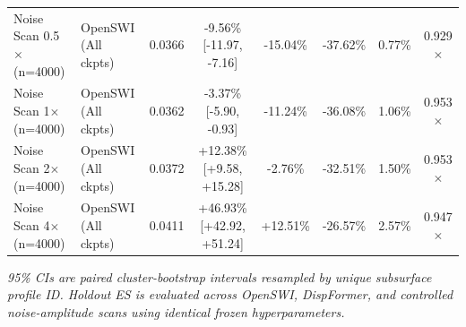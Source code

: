 \begin{table}[t]
\begin{tabular}{llcccccc}
Noise Scan 0.5$\times$ (n=4000) & OpenSWI (All ckpts) & 0.0366 & -9.56\% [-11.97, -7.16] & -15.04\% & -37.62\% & 0.77\% & 0.929$\times$ \\
Noise Scan 1$\times$ (n=4000) & OpenSWI (All ckpts) & 0.0362 & -3.37\% [-5.90, -0.93] & -11.24\% & -36.08\% & 1.06\% & 0.953$\times$ \\
Noise Scan 2$\times$ (n=4000) & OpenSWI (All ckpts) & 0.0372 & +12.38\% [+9.58, +15.28] & -2.76\% & -32.51\% & 1.50\% & 0.953$\times$ \\
Noise Scan 4$\times$ (n=4000) & OpenSWI (All ckpts) & 0.0411 & +46.93\% [+42.92, +51.24] & +12.51\% & -26.57\% & 2.57\% & 0.947$\times$ \\
\bottomrule
\end{tabular}
\par\vspace{2pt}\noindent\footnotesize{\textit{95\% CIs are paired cluster-bootstrap intervals resampled by unique subsurface profile ID. Holdout ES is evaluated across OpenSWI, DispFormer, and controlled noise-amplitude scans using identical frozen hyperparameters.}}
\end{table}

